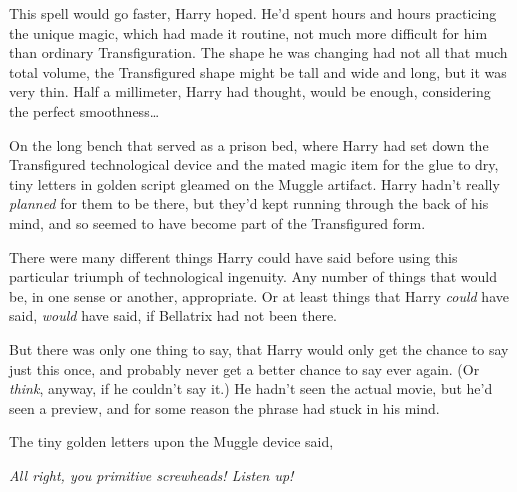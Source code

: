 This spell would go faster, Harry hoped. He'd spent hours and hours practicing the unique magic, which had made it routine, not much more difficult for him than ordinary Transfiguration. The shape he was changing had not all that much total volume, the Transfigured shape might be tall and wide and long, but it was very thin. Half a millimeter, Harry had thought, would be enough, considering the perfect smoothness{\ldots}

On the long bench that served as a prison bed, where Harry had set down the Transfigured technological device and the mated magic item for the glue to dry, tiny letters in golden script gleamed on the Muggle artifact. Harry hadn't really \emph{planned} for them to be there, but they'd kept running through the back of his mind, and so seemed to have become part of the Transfigured form.

There were many different things Harry could have said before using this particular triumph of technological ingenuity. Any number of things that would be, in one sense or another, appropriate. Or at least things that Harry \emph{could} have said, \emph{would} have said, if Bellatrix had not been there.

But there was only one thing to say, that Harry would only get the chance to say just this once, and probably never get a better chance to say ever again. (Or \emph{think}, anyway, if he couldn't say it.) He hadn't seen the actual movie, but he'd seen a preview, and for some reason the phrase had stuck in his mind.

The tiny golden letters upon the Muggle device said,

\emph{All right, you primitive screwheads! Listen up!}

